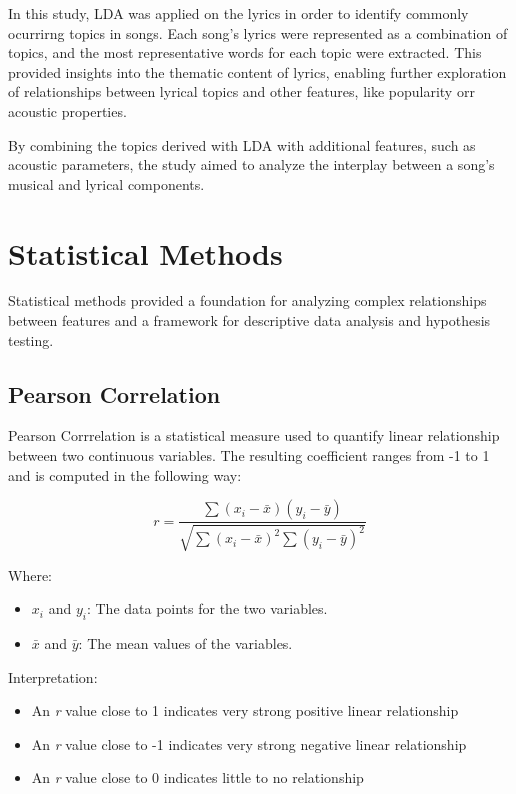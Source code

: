 In this study, LDA was applied on the lyrics in order to identify commonly
ocurrirng topics in songs. Each song's lyrics were represented as a combination
of topics, and the most representative words for each topic were extracted.
This provided insights into the thematic content of lyrics, enabling further
exploration of relationships between lyrical topics and other features, like
popularity orr acoustic properties.

By combining the topics derived with LDA with additional features, such as
acoustic parameters, the study aimed to analyze the interplay between a song's
musical and lyrical components.


\section{Statistical Methods}
\label{sec:statisticalmethods}

Statistical methods provided a foundation for analyzing complex relationships
between features and a framework for descriptive data analysis and hypothesis
testing.

\subsection{Pearson Correlation}

Pearson Corrrelation is a statistical measure used to quantify linear
relationship between two continuous variables. The resulting coefficient ranges
from -1 to 1 and is computed in the following way:

\[
r = \frac{\sum{(x_i - \bar{x})(y_i - \bar{y})}}{\sqrt{\sum{(x_i - \bar{x})^2} \sum{(y_i - \bar{y})^2}}}
\]

Where:
\begin{itemize}
    \item \( x_i \) and \( y_i \): The data points for the two variables.
    \item \( \bar{x} \) and \( \bar{y} \): The mean values of the variables.
\end{itemize}

Interpretation:
\begin{itemize}
  \item An \textit{r} value close to 1 indicates very strong positive linear relationship
  \item An \textit{r} value close to -1 indicates very strong negative linear relationship
  \item An \textit{r} value close to 0 indicates little to no relationship
\end{itemize}



